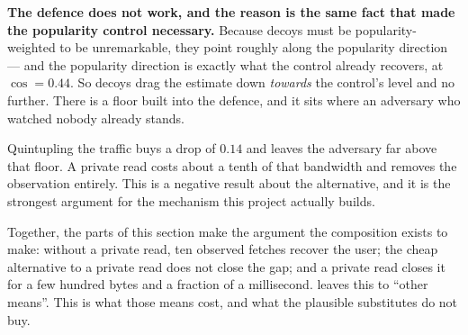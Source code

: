 \textbf{The defence does not work, and the reason is the same fact that made
the popularity control necessary.} Because decoys must be popularity-weighted
to be unremarkable, they point roughly along the popularity direction --- and
the popularity direction is exactly what the control already recovers, at
$\cos = 0.44$. So decoys drag the estimate down \emph{towards} the control's
level and no further. There is a floor built into the defence, and it sits
where an adversary who watched nobody already stands.

Quintupling the traffic buys a drop of $0.14$ and leaves the adversary far
above that floor. A private read costs about a tenth of that bandwidth and
removes the observation entirely. This is a negative result about the
alternative, and it is the strongest argument for the mechanism this project
actually builds.

\medskip

Together, the parts of this section make the argument the composition exists to
make: without a private read, ten observed fetches recover the user; the cheap
alternative to a private read does not close the gap; and a private read closes
it for a few hundred bytes and a fraction of a millisecond. \nudgeplain{} leaves
this to ``other means''. This is what those means cost, and what the plausible
substitutes do not buy.
